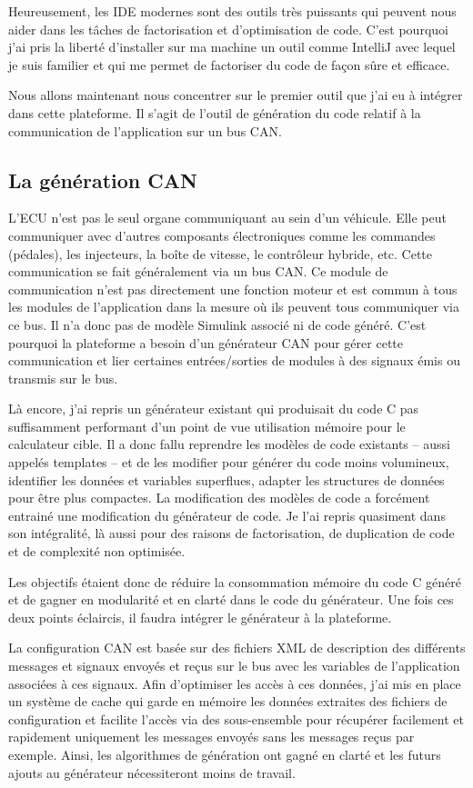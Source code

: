 Heureusement, les IDE modernes sont des outils très puissants qui peuvent nous
aider dans les tâches de factorisation et d'optimisation de code. C'est pourquoi
j'ai pris la liberté d'installer sur ma machine un outil comme IntelliJ avec
lequel je suis familier et qui me permet de factoriser du code de façon sûre et
efficace.

Nous allons maintenant nous concentrer sur le premier outil que j'ai eu à
intégrer dans cette plateforme. Il s'agit de l'outil de génération du code
relatif à la communication de l'application sur un bus CAN.

\subsection{La génération CAN}
L'ECU n'est pas le seul organe communiquant au sein d'un véhicule. Elle peut
communiquer avec d'autres composants électroniques comme les commandes
(pédales), les injecteurs, la boîte de vitesse, le contrôleur hybride, etc.
Cette communication se fait généralement via un bus CAN. Ce module de
communication n'est pas directement une fonction moteur et est commun à tous les
modules de l'application dans la mesure où ils peuvent tous communiquer via ce
bus. Il n'a donc pas de modèle Simulink\up{\circledR} associé ni de code généré.
C'est pourquoi la plateforme a besoin d'un générateur CAN pour gérer cette
communication et lier certaines entrées/sorties de modules à des signaux émis ou
transmis sur le bus.

Là encore, j'ai repris un générateur existant qui produisait du code C pas
suffisamment performant d'un point de vue utilisation mémoire pour le
calculateur cible. Il a donc fallu reprendre les modèles de code existants --
aussi appelés \og templates \fg{} -- et de les modifier pour générer du code
moins volumineux, identifier les données et variables superflues, adapter les
structures de données pour être plus compactes. La modification des modèles de
code a forcément entrainé une modification du générateur de code. Je l'ai repris
quasiment dans son intégralité, là aussi pour des raisons de factorisation, de
duplication de code et de complexité non optimisée.

Les objectifs étaient donc de réduire la consommation mémoire du code C
généré et de gagner en modularité et en clarté dans le code du générateur.
Une fois ces deux points éclaircis, il faudra intégrer le générateur à la
plateforme.

La configuration CAN est basée sur des fichiers XML de description des
différents messages et signaux envoyés et reçus sur le bus avec les variables
de l'application associées à ces signaux. Afin d'optimiser les accès à ces
données, j'ai mis en place un système de cache qui garde en mémoire les données
extraites des fichiers de configuration et facilite l'accès via des
sous-ensemble pour récupérer facilement et rapidement uniquement les messages
envoyés sans les messages reçus par exemple. Ainsi, les algorithmes de
génération ont gagné en clarté et les futurs ajouts au générateur nécessiteront
moins de travail.


